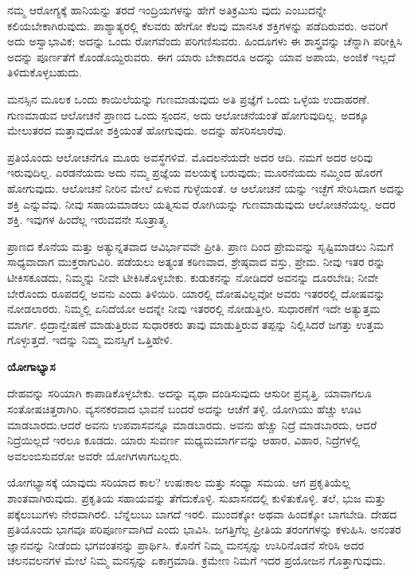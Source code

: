 ನಮ್ಮ ಆರೋಗ್ಯಕ್ಕೆ ಹಾನಿಯನ್ನು ತರದೆ ಇಂದ್ರಿಯಗಳನ್ನು ಹೇಗೆ ಅತಿಕ್ರಮಿಸು ವುದು ಎಂಬುದನ್ನೇ ಕಲಿಯಬೇಕಾಗಿರುವುದು. ಪಾಶ್ಯಾತ್ಯರಲ್ಲಿ ಕೆಲವರು ಹೇಗೋ ಕೆಲವು ಮಾನಸಿಕ ಶಕ್ತಿಗಳನ್ನು ಪಡೆದಿರುವರು. ಅವರಿಗೆ ಅದು ಅಸ್ವಾಭಾವಿಕ; ಅದನ್ನು ಒಂದು ರೋಗವೆಂದು ಪರಿಗಣಿಸುವರು. ಹಿಂದೂಗಳು ಈ ಶಾಸ್ತ್ರವನ್ನು ಚೆನ್ನಾಗಿ ಪರೀಕ್ಷಿಸಿ ಅದನ್ನು ಪೂರ್ಣತೆಗೆ ಕೊಂಡೊಯ್ದಿರುವರು. ಈಗ ಯಾರು ಬೇಕಾದರೂ ಅದನ್ನು ಯಾವ ಅಪಾಯ, ಅಂಜಿಕೆ ಇಲ್ಲದೆ ತಿಳಿದುಕೊಳ್ಳಬಹುದು.

ಮನಸ್ಸಿನ ಮೂಲಕ ಒಂದು ಕಾಯಿಲೆಯನ್ನು ಗುಣಮಾಡುವುದು ಅತಿ ಪ್ರಜ್ಞೆಗೆ ಒಂದು ಒಳ್ಳೆಯ ಉದಾಹರಣೆ. ಗುಣಮಾಡುವ ಆಲೋಚನೆ ಪ್ರಾಣದ ಒಂದು ಸ್ಪಂದನ, ಅದು ಆಲೋಚನೆಯಂತೆ ಹೋಗುವುದಿಲ್ಲ. ಅದಕ್ಕೂ ಮೇಲುತರದ ಮತ್ತಾವುದೋ ಶಕ್ತಿಯಂತೆ ಹೋಗುವುದು. ಅದನ್ನು ಹೆಸರಿಸಲಾರೆವು.

ಪ್ರತಿಯೊಂದು ಆಲೋಚನೆಗೂ ಮೂರು ಅವಸ್ಥೆಗಳಿವೆ. ಮೊದಲನೆಯದೇ ಅದರ ಆದಿ. ನಮಗೆ ಅದರ ಅರಿವು ಇರುವುದಿಲ್ಲ. ಎರಡನೆಯದು ಅದು ನಮ್ಮ ಪ್ರಜ್ಞೆಯ ವಲಯಕ್ಕೆ ಬರುವುದು; ಮೂರನೆಯದು ನಮ್ಮಿಂದ ಹೊರಗೆ ಹೋಗುವುದು. ಆಲೋಚನೆ ನೀರಿನ ಮೇಲೆ ಏಳುವ ಗುಳ್ಳೆಯಂತೆ. ಆ ಆಲೋಚನೆ ಯನ್ನು ಇಚ್ಛೆಗೆ ಸೇರಿಸಿದಾಗ ಅದನ್ನು ಶಕ್ತಿ ಎನ್ನುವೆವು. ನೀವು ಸಹಾಯಮಾಡಲು ಯತ್ನಿಸುವ ರೋಗಿಯನ್ನು ಗುಣಮಾಡುವುದು ಆಲೋಚನೆಯಲ್ಲ. ಅದರ ಶಕ್ತಿ. ಇವುಗಳ ಹಿಂದೆಲ್ಲ ಇರುವವನೇ ಸೂತ್ರಾತ್ಮ.

ಪ್ರಾಣದ ಕೊನೆಯ ಮತ್ತು ಅತ್ಯುನ್ನತವಾದ ಆವಿರ್ಭಾವವೇ ಪ್ರೀತಿ. ಪ್ರಾಣ ದಿಂದ ಪ್ರೇಮವನ್ನು ಸೃಷ್ಟಿಮಾಡಲು ನಿಮಗೆ ಸಾಧ್ಯವಾದಾಗ ಮುಕ್ತರಾಗುವಿರಿ. ಪಡೆಯಲು ಅತ್ಯಂತ ಕಠಿಣವಾದ, ಶ್ರೇಷ್ಠವಾದ ವಸ್ತು, ಪ್ರೇಮ. ನೀವು ಇತರ ರನ್ನು ಟೀಕಿಸಕೂಡದು, ನಿಮ್ಮನ್ನು ನೀವೇ ಟೀಕಿಸಿಕೊಳ್ಳಬೇಕು. ಕುಡುಕನನ್ನು ನೋಡಿದರೆ ಅವನನ್ನು ದೂರಬೇಡಿ; ನೀವೇ ಬೇರೊಂದು ರೂಪದಲ್ಲಿ ಅವನು ಎಂದು ತಿಳಿಯಿರಿ. ಯಾರಲ್ಲಿ ದೋಷವಿಲ್ಲವೋ ಅವರು ಇತರರಲ್ಲಿ ದೋಷವನ್ನು ನೋಡಲಾರರು. ನಿಮ್ಮಲ್ಲಿ ಏನಿದೆಯೋ ಅದನ್ನೇ ನೀವು ಇತರರಲ್ಲಿ ನೋಡುತ್ತೀರಿ. ಸುಧಾರಣೆಗೆ ಇದೇ ಅತ್ಯುತ್ತಮ ಮಾರ್ಗ. ಛಿದ್ರಾನ್ವೇಷಣೆ ಮಾಡುತ್ತಿರುವ ಸುಧಾರಕರು ತಾವು ಮಾಡುತ್ತಿರುವ ತಪ್ಪನ್ನು ನಿಲ್ಲಿಸಿದರೆ ಜಗತ್ತು ಉತ್ತಮ ಗೊಳ್ಳುತ್ತದೆ. ಇದನ್ನು ನಿಮ್ಮ ಮನಸ್ಸಿಗೆ ಒತ್ತಿಹೇಳಿ.

\begin{center}
\textbf{ಯೋಗಾಭ್ಯಾಸ}
\end{center}

ದೇಹವನ್ನು ಸರಿಯಾಗಿ ಕಾಪಾಡಿಕೊಳ್ಳಬೇಕು. ಅದನ್ನು ವೃಥಾ ದಂಡಿಸುವುದು ಆಸುರೀ ಪ್ರವೃತ್ತಿ. ಯಾವಾಗಲೂ ಸಂತೋಷಚಿತ್ತರಾಗಿರಿ. ವ್ಯಸನಕರವಾದ ಭಾವನೆ ಬಂದರೆ ಅದನ್ನು ಆಚೆಗೆ ತಳ್ಳಿ. ಯೋಗಿಯು ಹೆಚ್ಚು ಊಟ ಮಾಡಬಾರದು.ಆದರೆ ಅವನು ಉಪವಾಸವನ್ನೂ ಮಾಡಬಾರದು. ಅವನು ಹೆಚ್ಚು ನಿದ್ರೆ ಮಾಡಬಾರದು, ಆದರೆ ನಿದ್ರೆಯಿಲ್ಲದೆ ಇರಲೂ ಕೂಡದು. ಯಾರು ಸುವರ್ಣ ಮಧ್ಯಮಮಾರ್ಗವನ್ನು ಆಹಾರ, ವಿಹಾರ, ನಿದ್ರೆಗಳಲ್ಲಿ ಅವಲಂಬಿಸುವರೋ ಅವರೇ ಯೋಗಿಗಳಾಗಬಲ್ಲರು.

ಯೋಗಭ್ಯಾಸಕ್ಕೆ ಯಾವುದು ಸರಿಯಾದ ಕಾಲ? ಉಷಃಕಾಲ ಮತ್ತು ಸಂಧ್ಯಾ ಸಮಯ. ಆಗ ಪ್ರಕೃತಿಯೆಲ್ಲ ಶಾಂತವಾಗಿರುವುದು. ಪ್ರಕೃತಿಯ ಸಹಾಯವನ್ನು ತೆಗೆದುಕೊಳ್ಳಿ. ಸುಖಾಸನದಲ್ಲಿ ಕುಳಿತುಕೊಳ್ಳಿ. ತಲೆ, ಭುಜ ಮತ್ತು ಪಕ್ಕೆಲುಬುಗಳು ನೇರವಾಗಿರಲಿ. ಬೆನ್ನೆಲುಬು ಬಾಗದೆ ಇರಲಿ. ಮುಂದಕ್ಕೋ ಅಥವಾ ಹಿಂದಕ್ಕೋ ಬಾಗಬೇಡಿ. ದೇಹದ ಪ್ರತಿಯೊಂದು ಭಾಗವೂ ಪರಿಪೂರ್ಣವಾಗಿದೆ ಎಂದು ಭಾವಿಸಿ. ಜಗತ್ತಿಗೆಲ್ಲ ಪ್ರೀತಿಯ ತರಂಗಗಳನ್ನು ಕಳುಹಿಸಿ. ಅನಂತರ ಜ್ಞಾನವನ್ನು ನೀಡೆಂದು ಭಗವಂತನನ್ನು ಪ್ರಾರ್ಥಿಸಿ. ಕೊನೆಗೆ ನಿಮ್ಮ ಮನಸ್ಸನ್ನು ಉಸಿರಿನೊಡನೆ ಸೇರಿಸಿ ಅದರ ಚಲನವಲನಗಳ ಮೇಲೆ ನಿಮ್ಮ ಮನಸ್ಸನ್ನು ಏಕಾಗ್ರಮಾಡಿ. ಕ್ರಮೇಣ ನಿಮಗೆ ಇದರ ಪ್ರಯೋಜನ ಗೊತ್ತಾಗುವುದು.

